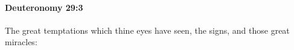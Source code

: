 
		\paragraph{Deuteronomy 29:3} %
			\label{DEUTERONOMY-29-3}

			The great temptations which thine eyes have seen, the signs, and those great miracles:



